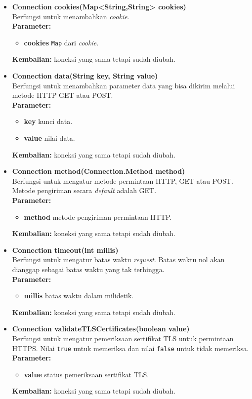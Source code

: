\begin{itemize}
	\item \textbf{Connection cookies(Map<String,String> cookies)} \\
		Berfungsi untuk menambahkan \textit{cookie}. \\
		\textbf{Parameter:}
		\begin{itemize}
			\item \textbf{cookies} \texttt{Map} dari \textit{cookie}.
		\end{itemize}
		\textbf{Kembalian:} koneksi yang sama tetapi sudah diubah.
		
		\item \textbf{Connection data(String key, String value)} \\
		Berfungsi untuk menambahkan parameter data yang bisa dikirim melalui metode HTTP GET atau POST. \\
		\textbf{Parameter:}
		\begin{itemize}
			\item \textbf{key} kunci data.
			\item \textbf{value} nilai data.
		\end{itemize}
		\textbf{Kembalian:} koneksi yang sama tetapi sudah diubah.
		
		\item \textbf{Connection method(Connection.Method method)} \\
		Berfungsi untuk mengatur metode permintaan HTTP, GET atau POST. Metode pengiriman secara \textit{default} adalah GET.\\
		\textbf{Parameter:}
		\begin{itemize}
			\item \textbf{method} metode pengiriman permintaan HTTP.
		\end{itemize}
		\textbf{Kembalian:} koneksi yang sama tetapi sudah diubah.
		
		\item \textbf{Connection timeout(int millis)} \\
		Berfungsi untuk mengatur batas waktu \textit{request}. Batas waktu nol akan dianggap sebagai batas waktu yang tak terhingga. \\
		\textbf{Parameter:}
		\begin{itemize}
			\item \textbf{millis} batas waktu dalam milidetik.
		\end{itemize}
		\textbf{Kembalian:} koneksi yang sama tetapi sudah diubah.
		
		\item \textbf{Connection validateTLSCertificates(boolean value)} \\
		Berfungsi untuk mengatur pemeriksaan sertifikat TLS untuk permintaan HTTPS. Nilai \texttt{true} untuk memeriksa dan nilai \texttt{false} untuk tidak memeriksa.\\
		\textbf{Parameter:}
		\begin{itemize}
			\item \textbf{value} status pemeriksaan sertifikat TLS.
		\end{itemize}
		\textbf{Kembalian:} koneksi yang sama tetapi sudah diubah.
		

\end{itemize}
